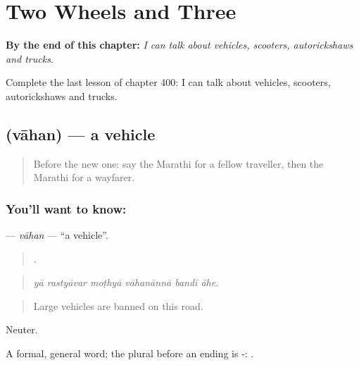
\chapter{Two Wheels and Three}
\label{ch:mr-two-wheels-and-three}

\begin{chapteropening}
\textbf{By the end of this chapter:} \emph{I can talk about vehicles, scooters, autorickshaws and trucks.}

Complete the last lesson of chapter 400: I can talk about vehicles, scooters, autorickshaws and trucks.
\end{chapteropening}

\section[\texorpdfstring{\mr{वाहन} (vāhan)}{वाहन (vāhan)}]{ (vāhan) — a vehicle}

\label{lesson:MR-C400-vahan}



\begin{quote}
Before the new one: say the Marathi for a fellow traveller, then the Marathi for a wayfarer.
\end{quote}

\subsection*{You'll want to know: }
\textbf{} — \emph{vāhan} — \textquotedblleft{}a vehicle\textquotedblright{}.

\begin{quote}
     .
\end{quote}

\begin{quote}
\emph{yā rastyāvar moṭhyā vāhanānnā bandī āhe.}
\end{quote}

\begin{quote}
Large vehicles are banned on this road.
\end{quote}

Neuter.

A formal, general word; the plural before an ending is -: .

